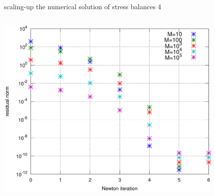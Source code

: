 \begin{frame}{scaling-up the numerical solution of stress balances 4}
\begin{columns}
\begin{column}{0.6\textwidth}
\begin{center}
\includegraphics[width=0.85\textwidth]{petsc/notes/quadconv}
\end{center}

\scriptsize

\end{column}
\end{columns}

\end{frame}
